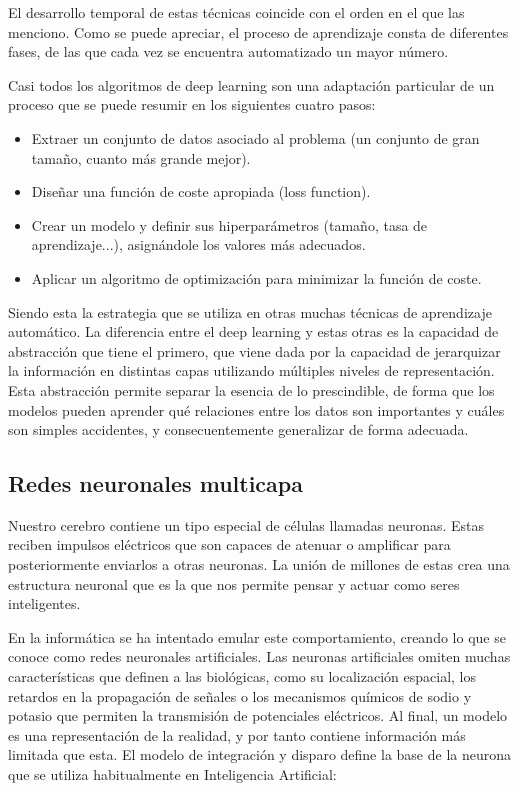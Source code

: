 El desarrollo temporal de estas técnicas coincide con el orden en el que las menciono. Como se puede apreciar, el proceso de aprendizaje consta de diferentes fases, de las que cada vez se encuentra automatizado un mayor número. \cite{berzal2018redes}

Casi todos los algoritmos de deep learning son una adaptación particular de un proceso que se puede resumir en los siguientes cuatro pasos:

\begin{itemize}
    \item Extraer un conjunto de datos asociado al problema (un conjunto de gran tamaño, cuanto más grande mejor).
    \item Diseñar una función de coste apropiada (loss function).
    \item Crear un modelo y definir sus hiperparámetros (tamaño, tasa de aprendizaje...), asignándole los valores más adecuados.
    \item Aplicar un algoritmo de optimización para minimizar la función de coste.
\end{itemize}

Siendo esta la estrategia que se utiliza en otras muchas técnicas de aprendizaje automático. La diferencia entre el deep learning y estas otras es la capacidad de abstracción que tiene el primero, que viene dada por la capacidad de jerarquizar la información en distintas capas utilizando múltiples niveles de representación. Esta abstracción permite separar la esencia de lo prescindible, de forma que los modelos pueden aprender qué relaciones entre los datos son importantes y cuáles son simples accidentes, y consecuentemente generalizar de forma adecuada. \cite{berzal2018redes}

\subsection{Redes neuronales multicapa}
Nuestro cerebro contiene un tipo especial de células llamadas neuronas. Estas reciben impulsos eléctricos que son capaces de atenuar o amplificar para posteriormente enviarlos a otras neuronas. La unión de millones de estas crea una estructura neuronal que es la que nos permite pensar y actuar como seres inteligentes.

En la informática se ha intentado emular este comportamiento, creando lo que se conoce como redes neuronales artificiales. Las neuronas artificiales omiten muchas características que definen a las biológicas, como su localización espacial, los retardos en la propagación de señales o los mecanismos químicos de sodio y potasio que permiten la transmisión de potenciales eléctricos. Al final, un modelo es una representación de la realidad, y por tanto contiene información más limitada que esta. El modelo de integración y disparo define la base de la neurona que se utiliza habitualmente en Inteligencia Artificial:

